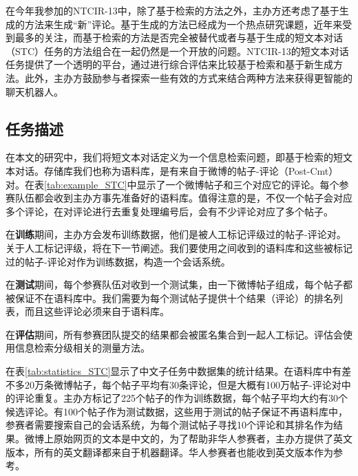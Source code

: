 在今年我参加的NTCIR-13中，除了基于检索的方法之外，主办方还考虑了基于生成的方法来生成“新”评论。基于生成的方法已经成为一个热点研究课题，近年来受到最多的关注，而基于检索的方法是否完全被替代或者与基于生成的短文本对话（STC）任务的方法组合在一起仍然是一个开放的问题。NTCIR-13的短文本对话任务提供了一个透明的平台，通过进行综合评估来比较基于检索和基于新生成方法。此外，主办方鼓励参与者探索一些有效的方式来结合两种方法来获得更智能的聊天机器人。


\subsection{任务描述}
在本文的研究中，我们将短文本对话定义为一个信息检索问题，即基于检索的短文本对话。存储库我们也称为语料库，是有来自于微博的帖子-评论（Post-Cmt）对。在表\ref{tab:example_STC}中显示了一个微博帖子和三个对应它的评论。每个参赛队伍都会收到主办方事先准备好的语料库。值得注意的是，不仅一个帖子会对应多个评论，在对评论进行去重复处理编号后，会有不少评论对应了多个帖子。

在\textbf{训练}期间，主办方会发布训练数据，他们是被人工标记评级过的帖子-评论对。关于人工标记评级，将在下一节阐述。我们要使用之间收到的语料库和这些被标记过的帖子-评论对作为训练数据，构造一个会话系统。
 
在\textbf{测试}期间，每个参赛队伍对收到一个测试集，由一下微博帖子组成，每个帖子都被保证不在语料库中。我们需要为每个测试帖子提供十个结果（评论）的排名列表，而且这些评论必须来自于语料库。

在\textbf{评估}期间，所有参赛团队提交的结果都会被匿名集合到一起人工标记。评估会使用信息检索分级相关的测量方法。

在表\ref{tab:statistics_STC}显示了中文子任务中数据集的统计结果。在语料库中有差不多20万条微博帖子，每个帖子平均有30条评论，但是大概有100万帖子-评论对中的评论重复。主办方标记了225个帖子的作为训练数据，每个帖子平均大约有30个候选评论。有100个帖子作为测试数据，这些用于测试的帖子保证不再语料库中，参赛者需要搜索自己的会话系统，为每个测试帖子寻找10个评论和其排名作为结果。微博上原始网页的文本是中文的，为了帮助非华人参赛者，主办方提供了英文版本，所有的英文翻译都来自于机器翻译。华人参赛者也能收到英文版本作为参考。


